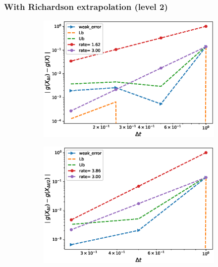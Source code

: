 \documentclass[11pt]{article}
\begin{document}
\subsubsection*{With Richardson extrapolation (level 2)}
%
\begin{figure}[h!]
	\centering
	\begin{subfigure}{.4\textwidth}
		\centering
		\includegraphics[width=1\linewidth]{./figures/rBergomi_weak_error_rates/with_richardson/H_043/weak_convergence_order_Bergomi_H_043_K_1_richardson_level2_relative_M_10_6}
		\caption{}
		\label{fig:sub3}
	\end{subfigure}%
	\begin{subfigure}{.4\textwidth}
		\centering
		\includegraphics[width=1\linewidth]{./figures/rBergomi_weak_error_rates/with_richardson/H_043/weak_convergence_order_differences_Bergomi_H_043_K_1_richardson_level2_relative_M_10_6}
		\caption{}
		\label{fig:sub4}
	\end{subfigure}
	

\end{figure}
\end{document}
